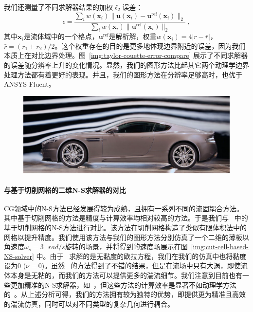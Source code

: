 我们还测量了不同求解器结果的加权$\ell_2$误差：
\begin{equation}\label{eq:error_metric}
\epsilon = \frac{\sum_i w(\bm{x}_i)\|\bm{u}(\bm{x}_i)-\bm{u}^{\text{ref}}(\bm{x}_i)\|_2}{\sum_i w(\bm{x}_i)\|\bm{u}^{\text{ref}}(\bm{x}_i)\|_2}\;,
\end{equation}
其中$\bm{x}_i$是流体域中的一个格点，$\bm{u}^{\text{ref}}$是解析解，权重$w(\bm{x}_i) \!=\! 4|r-\bar{r}|$，$\bar{r}\!=\!(r_1+r_2)/2$。这个权重存在的目的是更多地体现边界附近的误差，因为我们本质上在对比边界处理。图~\ref{img:taylor-couette-error-compare} 展示了不同求解器的误差随分辨率上升的变化情况。显然，我们的图形方法比起其它两个动理学边界处理方法都有着更好的表现。并且，我们的图形方法在分辨率足够高时，也优于ANSYS Fluent。

\begin{figure}[htbp]
  \centering
    \includegraphics[width=0.99\columnwidth]{figures/car_wind_tunnel.png}
  \label{img:car_wind_tunnel}
\end{figure}

\paragraph{与基于切削网格的二维N-S求解器的对比}
CG领域中的N-S方法已经发展得较为成熟，且拥有一系列不同的流固耦合方法。其中基于切削网格的方法是精度与计算效率均相对较高的方法。于是我们与~\citep{Azevedo-2016} 中的基于切削网格的N-S方法进行对比。该方法在切削网格构造了类似有限体积法中的网格以提升精度。我们使用该方法与我们的图形方法分别仿真了一个二维的薄板以角速度$\omega_s = 3 \text{ } rad/s$旋转的场景，并将得到的速度场展示在图~\ref{img:cut-cell-based-NS-solver} 中。由于~\citet{Azevedo-2016} 求解的是无黏度的欧拉方程，我们在我们的仿真中也将黏度设为0 ($\nu\!=\!0$)。虽然~\citet{Azevedo-2016} 的方法得到了不错的结果，但是在流场中只有大涡，即使流体本身是无粘的，而我们的方法可以提供更多的湍流细节。我们注意到目前也有一些更加精准的N-S求解器，如~\citep{zehnder2018advection,qu2019efficient}，但这些方法的计算效率是显著不如动理学方法的~\citep{Li-2020}。从上述分析可得，我们的方法拥有较为独特的优势，即提供更为精准且高效的湍流仿真，同时可以对不同类型的复杂几何进行耦合。


